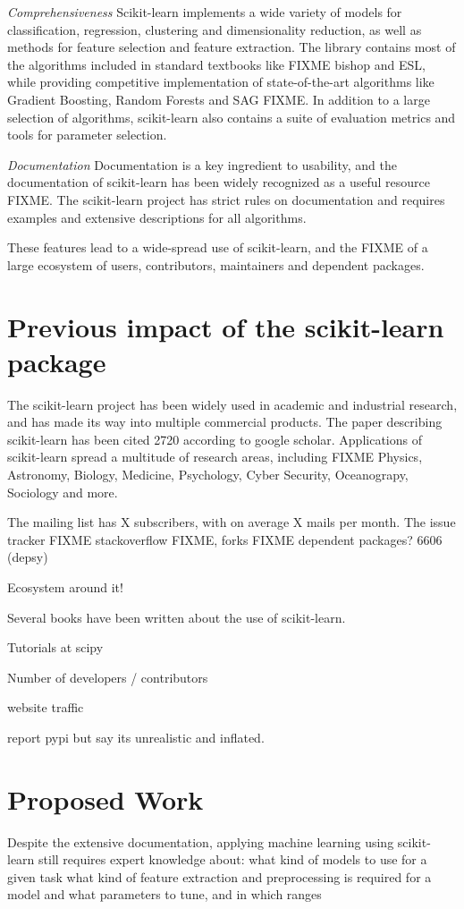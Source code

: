 \emph{Comprehensiveness} Scikit-learn implements a wide variety of models for classification,
regression, clustering and dimensionality reduction, as well as methods for feature
selection and feature extraction. The library contains most of the algorithms included
in standard textbooks like FIXME bishop and ESL, while providing competitive implementation
of state-of-the-art algorithms like Gradient Boosting, Random Forests and SAG FIXME\@.
In addition to a large selection of algorithms, scikit-learn also contains a suite
of evaluation metrics and tools for parameter selection.

\emph{Documentation}
Documentation is a key ingredient to usability, and the documentation of scikit-learn
has been widely recognized as a useful resource FIXME\@. The scikit-learn project
has strict rules on documentation and requires examples and extensive descriptions
for all algorithms.

These features lead to a wide-spread use of scikit-learn, and the FIXME of a large
ecosystem of users, contributors, maintainers and dependent packages.

\section{Previous impact of the scikit-learn package}
The scikit-learn project has been widely used in academic and industrial research,
and has made its way into multiple commercial products. The paper describing scikit-learn
has been cited 2720 according to google scholar. Applications of scikit-learn spread
a multitude of research areas, including FIXME Physics, Astronomy,
Biology, Medicine, Psychology, Cyber Security, Oceanograpy, Sociology and more.

The mailing list has X subscribers, with on average X mails per month.
The issue tracker FIXME stackoverflow FIXME, forks FIXME
dependent packages? 6606 (depsy)

Ecosystem around it!

Several books have been written about the use of scikit-learn.

Tutorials at scipy

Number of developers / contributors

website traffic

report pypi but say its unrealistic and inflated.

\section{Proposed Work}
Despite the extensive documentation, applying machine learning using scikit-learn
still requires expert knowledge about:
what kind of models to use for a given task
what kind of feature extraction and preprocessing is required for a model
and what parameters to tune, and in which ranges

